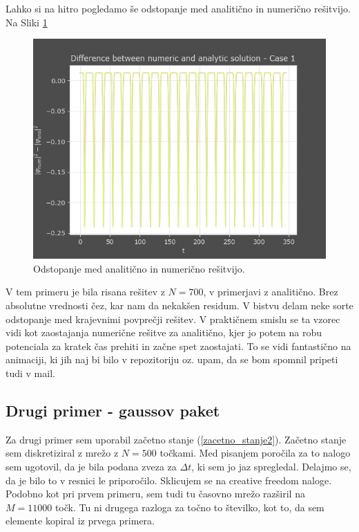 \documentclass[a4paper]{article}
\begin{document}
Lahko si na hitro pogledamo še odstopanje med analitično in numerično rešitvijo. Na Sliki \ref{fig:harmonic_oscillator_error}

\begin{figure}[H]
    \centering
    \includegraphics[width=\textwidth]{./images/delta_numeric_analytic_N700.png}
    \caption{Odstopanje med analitično in numerično rešitvijo.}
    \label{fig:harmonic_oscillator_error}
\end{figure}

V tem primeru je bila risana rešitev z $N=700$, v primerjavi z analitično. Brez absolutne vrednosti
čez, kar nam da nekakšen residum. V bistvu delam neke sorte odstopanje med krajevnimi povprečji rešitev. 
V praktičnem smislu se ta vzorec vidi kot zaostajanja numerične rešitve za analitično, kjer jo potem na 
robu potenciala za kratek čas prehiti in začne spet zaostajati. To se vidi fantastično na animaciji, ki jih
naj bi bilo v repozitoriju oz. upam, da se bom spomnil pripeti tudi v mail. \\

\subsection{Drugi primer - gaussov paket}
Za drugi primer sem uporabil začetno stanje (\ref{zacetno_stanje2}).
Začetno stanje sem diskretiziral z mrežo z $N=500$ točkami. Med pisanjem poročila za to nalogo
sem ugotovil, da je bila podana zveza za $\Delta t$, ki sem jo jaz spregledal. Delajmo se, da je bilo to
v resnici le priporočilo. Sklicujem se na creative freedom naloge. Podobno kot pri prvem primeru, sem tudi
tu časovno mrežo razširil na $M=11000$ točk. Tu ni drugega razloga za točno to številko, kot to, da sem 
elemente kopiral iz prvega primera. \\
\end{document}

